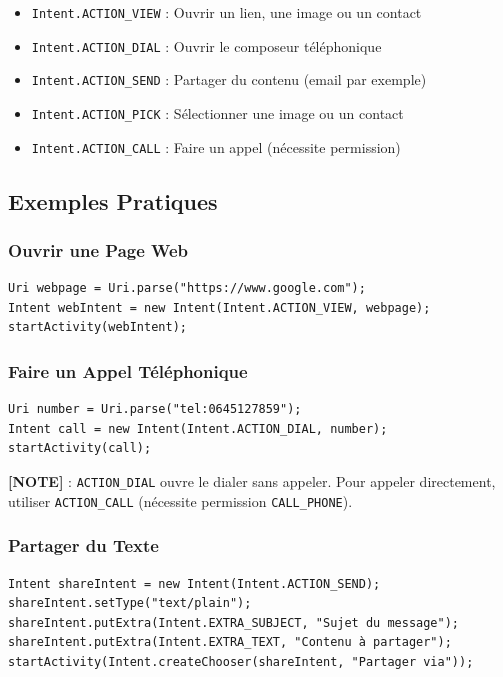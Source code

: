 \documentclass[11pt,a4paper]{article}
\begin{document}
\begin{itemize}
    \item \texttt{Intent.ACTION\_VIEW} : Ouvrir un lien, une image ou un contact
    \item \texttt{Intent.ACTION\_DIAL} : Ouvrir le composeur téléphonique
    \item \texttt{Intent.ACTION\_SEND} : Partager du contenu (email par exemple)
    \item \texttt{Intent.ACTION\_PICK} : Sélectionner une image ou un contact
    \item \texttt{Intent.ACTION\_CALL} : Faire un appel (nécessite permission)
\end{itemize}

\subsection{Exemples Pratiques}

\subsubsection{Ouvrir une Page Web}

\begin{lstlisting}
Uri webpage = Uri.parse("https://www.google.com");
Intent webIntent = new Intent(Intent.ACTION_VIEW, webpage);
startActivity(webIntent);
\end{lstlisting}

\subsubsection{Faire un Appel Téléphonique}

\begin{lstlisting}
Uri number = Uri.parse("tel:0645127859");
Intent call = new Intent(Intent.ACTION_DIAL, number);
startActivity(call);
\end{lstlisting}

\textbf{[NOTE]} : \texttt{ACTION\_DIAL} ouvre le dialer sans appeler. Pour appeler directement, utiliser \texttt{ACTION\_CALL} (nécessite permission \texttt{CALL\_PHONE}).

\subsubsection{Partager du Texte}

\begin{lstlisting}
Intent shareIntent = new Intent(Intent.ACTION_SEND);
shareIntent.setType("text/plain");
shareIntent.putExtra(Intent.EXTRA_SUBJECT, "Sujet du message");
shareIntent.putExtra(Intent.EXTRA_TEXT, "Contenu à partager");
startActivity(Intent.createChooser(shareIntent, "Partager via"));
\end{lstlisting}
\end{document}

